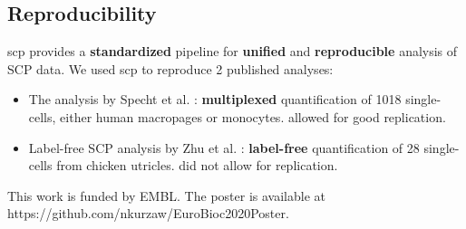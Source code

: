 \documentclass{article}
\newcommand{\hcode}[2][lgray]{{\ttfamily\color{vdgray}\colorbox{#1}{#2}}}
\begin{document}
\begin{multicols}{2}
\begin{minipage}[h]{0.6\linewidth}
\end{minipage}


\noindent
\begin{minipage}[t]{\linewidth}
  \section*{\huge Reproducibility}
  
  \hcode{scp} provides a \textbf{standardized} pipeline for 
  \textbf{unified} and \textbf{reproducible} analysis of SCP data. We 
  used \hcode{scp} to reproduce 2 published analyses:
  
  \begin{itemize}
    \item The analysis by Specht et al. \cite{Specht2020-jm}: 
    \textbf{multiplexed} quantification of 1018 single-cells, either 
    human macropages or monocytes. \textbf{\color{OliveGreen}{Good 
    documentation}} allowed for good replication.
    \item Label-free SCP analysis by Zhu et al. \cite{Zhu2019-ja}: 
    \textbf{label-free} quantification of 28 single-cells from chicken 
    utricles. \textbf{\color{BrickRed}{Poor documentation}} did not 
    allow for replication.
  \end{itemize}
  
\end{minipage}

\scriptsize
 


\noindent
This work is funded by EMBL. The poster is available at {\color{blue}
{https://github.com/nkurzaw/EuroBioc2020Poster}}.

\end{multicols}
\end{document}
